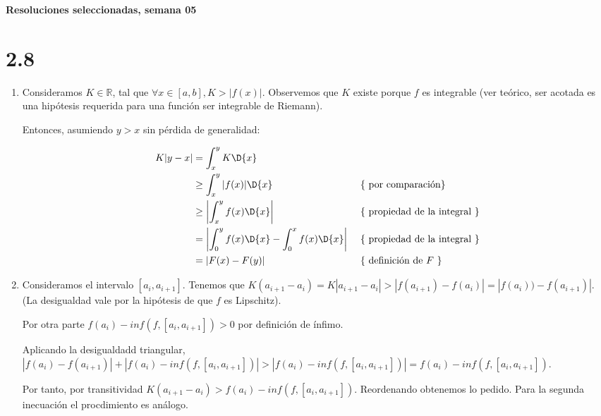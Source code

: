 \documentclass[10pt,a4paper]{article}
\newcommand{\R}{\mathbb{R}}
\begin{document}
\vspace{0,3cm}

\begin{center}
{\bf \Large Resoluciones seleccionadas, semana 05}
\end{center}


\vspace{0,3cm}

\section*{2.8}\emph{}%
\begin{enumerate}
\item
  Consideramos $K \in \R$, tal que $\forall x \in [a,b], K > |f(x)|$.
  Observemos que $K$ existe porque $f$ es integrable (ver te\'orico,
  ser acotada es una hip\'otesis requerida para una funci\'on ser
  integrable de Riemann).

  Entonces, asumiendo $y>x$ sin p\'erdida de generalidad:

  \begin{align*}
    K | y - x | & = \int_{x}^{y}{K \D{x}}  & &\\
    & \geq \int_{x}^{y}{|f(x)| \D{x}} & &\mbox{ \{ por comparaci\'on\}}\\
    & \geq \left| \int_{x}^{y}{f(x) \D{x}} \right|
    & &\mbox{ \{ propiedad de la integral \}}\\
    &= \left| \int_{0}^{y}{f(x) \D{x}} - \int_{0}^{x}{f(x) \D{x}} \right|
    & & \mbox{ \{ propiedad de la integral \}} \\
    &= \left|  F(x) - F(y) \right| & & \mbox{ \{ definici\'on de $F$ \}}
  \end{align*}

\item
  Consideramos el intervalo $[a_i, a_{i+1}]$.
  Tenemos que
  $K(a_{i+1} - a_i) = K|a_{i+1} - a_i| > |f(a_{i+1}) - f(a_i)| =
  |f(a_i)) - f(a_{i+1})|$. (La desigualdad vale por la hip\'otesis de que $f$
  es Lipschitz).

  Por otra parte $f(a_i) - inf(f,[a_i, a_{i+1}])>0$
  por definici\'on de \'infimo.

  Aplicando la desigualdadd triangular,
  $|f(a_i) - f(a_{i+1})| + |f(a_i) - inf(f,[a_i, a_{i+1}])|
  > | f(a_i)- inf(f,[a_i, a_{i+1}])| = f(a_i)- inf(f,[a_i, a_{i+1}])$.

  Por tanto, por transitividad
  $K(a_{i+1} - a_i) > f(a_i)- inf(f,[a_i, a_{i+1}])$. Reordenando obtenemos lo
  pedido. Para la segunda inecuaci\'on el procdimiento es an\'alogo.


\end{enumerate}
\end{document}
